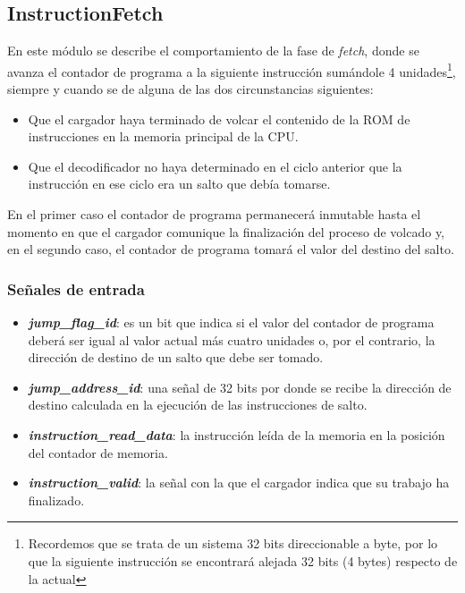 \subsection{InstructionFetch}

En este módulo se describe el comportamiento de la fase de \textit{fetch}, donde se avanza el contador de programa a la siguiente instrucción sumándole 4 unidades\footnote{Recordemos que se trata de un sistema 32 bits direccionable a byte, por lo que la siguiente instrucción se encontrará alejada 32 bits (4 bytes) respecto de la actual}, siempre y cuando se de alguna de las dos circunstancias siguientes:

\begin{itemize}
  \item Que el cargador haya terminado de volcar el contenido de la ROM de instrucciones en la memoria principal de la CPU.
  \vspace{-0.2cm}
  \item Que el decodificador no haya determinado en el ciclo anterior que la instrucción en ese ciclo era un salto que debía tomarse.
\end{itemize}

En el primer caso el contador de programa permanecerá inmutable hasta el momento en que el cargador comunique la finalización del proceso de volcado y, en el segundo caso, el contador de programa tomará el valor del destino del salto.

\subsubsection{Señales de entrada}

\begin{itemize}
  \item \textbf{\textit{jump\_flag\_id}}: es un bit que indica si el valor del contador de programa deberá ser igual al valor actual más cuatro unidades o, por el contrario, la dirección de destino de un salto que debe ser tomado.
  \vspace{-0.2cm}
  \item \textbf{\textit{jump\_address\_id}}: una señal de 32 bits por donde se recibe la dirección de destino calculada en la ejecución de las instrucciones de salto.
  \vspace{-0.2cm}
  \item \textbf{\textit{instruction\_read\_data}}: la instrucción leída de la memoria en la posición del contador de memoria.
  \vspace{-0.2cm}
  \item \textbf{\textit{instruction\_valid}}: la señal con la que el cargador indica que su trabajo ha finalizado.
\end{itemize}

